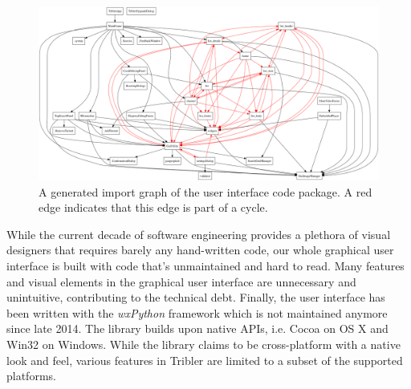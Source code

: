\begin{figure}[!h]
	\centering
	\includegraphics[width=1.0\columnwidth]{images/problem_description/wx_cycles}
	\caption{A generated import graph of the user interface code package. A red edge indicates that this edge is part of a cycle.}
	\label{fig:wx-import-graph}
\end{figure}

While the current decade of software engineering provides a plethora of visual designers that requires barely any hand-written code, our whole graphical user interface is built with code that's unmaintained and hard to read. Many features and visual elements in the graphical user interface are unnecessary and unintuitive, contributing to the technical debt. Finally, the user interface has been written with the \emph{wxPython} framework which is not maintained anymore since late 2014. The library builds upon native APIs, i.e. Cocoa on OS X and Win32 on Windows. While the library claims to be cross-platform with a native look and feel, various features in Tribler are limited to a subset of the supported platforms.


